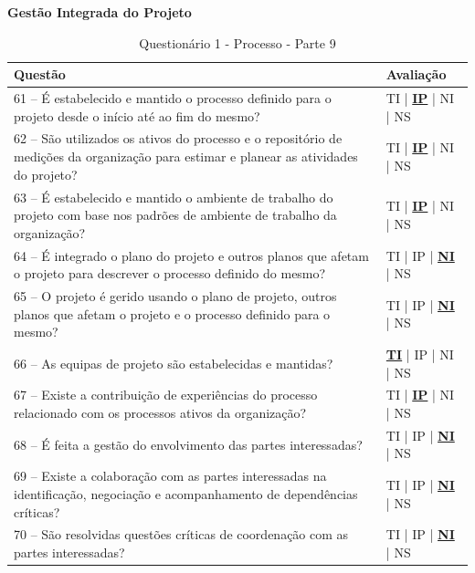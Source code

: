 \documentclass[openany,10pt,a4paper]{article}
\begin{document}
\begin{appendix}
	\begin{table}[H]
	\textbf{Gestão Integrada do Projeto}
		\centering
		\caption{Questionário 1 - Processo - Parte 9}
		\begin{tabular}{|p{5in}p{1in}|}		
			\hline
			\textbf{Questão}  & \textbf{Avaliação}\\ 
			\hline
			61 – É estabelecido e mantido o processo definido para o projeto desde o início até ao fim do mesmo?
	 & TI | \underline{\textbf{IP}} | NI | NS \\
			\hline
			62 – São utilizados os ativos do processo e o repositório de medições da organização para 
	estimar e planear as atividades do projeto?
	 & TI | \underline{\textbf{IP}} | NI | NS \\
			\hline
			63 – É estabelecido e mantido o ambiente de trabalho do projeto com base nos padrões de 
	ambiente de trabalho da organização?
	 & TI | \underline{\textbf{IP}} | NI | NS \\
			\hline
			64 – É integrado o plano do projeto e outros planos que afetam o projeto para descrever o 
	processo definido do mesmo?
	 & TI | IP | \underline{\textbf{NI}} | NS \\
			\hline
			65 – O projeto é gerido usando o plano de projeto, outros planos que afetam o projeto e o 
	processo definido para o mesmo?
	  & TI | IP | \underline{\textbf{NI}} | NS \\
			\hline
			66 – As equipas de projeto são estabelecidas e mantidas?
	 & \underline{\textbf{TI}} | IP | NI | NS \\
			\hline
			67 – Existe a contribuição de experiências do processo relacionado com os processos ativos da 
	organização?
	 & TI | \underline{\textbf{IP}} | NI | NS \\
			\hline
			68 – É feita a gestão do envolvimento das partes interessadas?
	 & TI | IP | \underline{\textbf{NI}} | NS \\
			\hline
			69  – Existe a colaboração com as partes interessadas na identificação, negociação e 
	acompanhamento de dependências críticas?
	 & TI | IP | \underline{\textbf{NI}} | NS \\
			\hline
			70 – São resolvidas questões críticas de coordenação com as partes interessadas?
	 & TI | IP | \underline{\textbf{NI}} | NS \\
			\hline
		\end{tabular} 
	\end{table}
	

\end{appendix}
\end{document}
